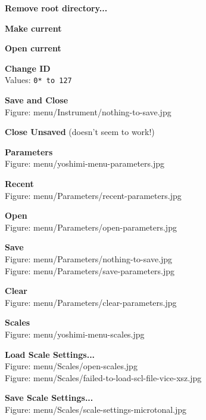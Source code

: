 \documentclass[
 11pt,
 twoside,
 a4paper,
 headinclude,
 footinclude,
 final                                 %
]{article}
\begin{document}
\begin{enumber}
\begin{enumber}
\begin{enumber}
\begin{enumber}
               \item \textbf{Remove root directory...}
               \item \textbf{Make current}
               \item \textbf{Open current}
               \item \textbf{Change ID} \\
                  Values: \texttt{0* to 127}
               \item \textbf{Save and Close} \\
                  Figure: menu/Instrument/nothing-to-save.jpg
               \item \textbf{Close Unsaved} (doesn't seem to work!)
            \end{enumber}
      \end{enumber}
      \item \textbf{Parameters} \\
         Figure: menu/yoshimi-menu-parameters.jpg
      \begin{enumber}
         \item \textbf{Recent} \\
            Figure: menu/Parameters/recent-parameters.jpg
         \item \textbf{Open} \\
            Figure: menu/Parameters/open-parameters.jpg
         \item \textbf{Save} \\
            Figure: menu/Parameters/nothing-to-save.jpg \\
            Figure: menu/Parameters/save-parameters.jpg
         \item \textbf{Clear} \\
            Figure: menu/Parameters/clear-parameters.jpg
      \end{enumber}
      \item \textbf{Scales} \\
         Figure: menu/yoshimi-menu-scales.jpg
      \begin{enumber}
         \item \textbf{Load Scale Settings...} \\
            Figure: menu/Scales/open-scales.jpg \\
            Figure: menu/Scales/failed-to-load-scl-file-vice-xsz.jpg
         \item \textbf{Save Scale Settings...} \\
            Figure: menu/Scales/scale-settings-microtonal.jpg

\end{enumber}
\end{enumber}
\end{enumber}
\end{document}
